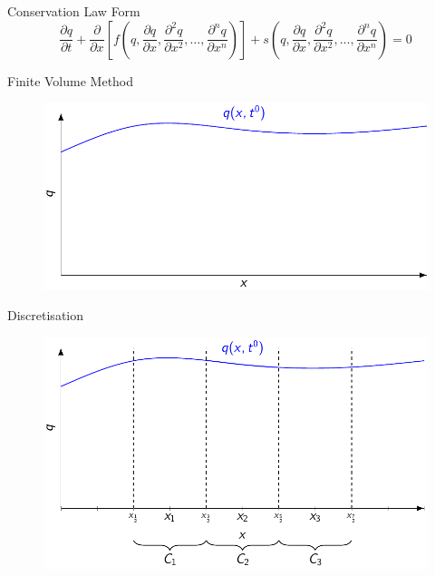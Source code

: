 \documentclass[pdf]{beamer}
\begin{document}
\begin{frame}{Conservation Law Form}
	\begin{equation*}
	{\frac{\partial q}{\partial t}} +  {\frac{\partial}{\partial x}} \left[ f\left(q,{\frac{\partial q}{\partial x}}, {\frac{\partial^2 q}{\partial x^2}}, \dots,{\frac{\partial^n q}{\partial x^n}}\right)\right] + s\left(q,{\frac{\partial q}{\partial x}}, {\frac{\partial^2 q}{\partial x^2}}, \dots,{\frac{\partial^n q}{\partial x^n}}\right) = 0
	\end{equation*}
\end{frame}
\begin{frame}{Finite Volume Method}
	\begin{figure}
		\includegraphics[width=\textwidth]{./Pics/Tex/FVM/Function.pdf}
	\end{figure}
\end{frame}

\begin{frame}{Discretisation}
	\begin{figure}
		\includegraphics[width=\textwidth]{./Pics/Tex/FVM/Cells.pdf}
	\end{figure}
\end{frame}
\end{document}
